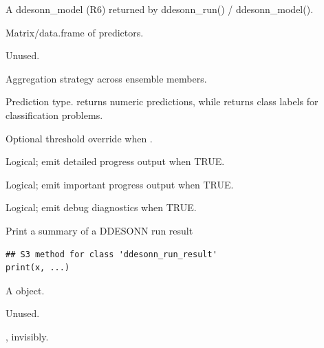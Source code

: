 \documentclass[a4paper]{book}
\begin{document}
\begin{Arguments}
\begin{ldescription}
\item[\code{object}] A ddesonn\_model (R6) returned by ddesonn\_run() / ddesonn\_model().

\item[\code{newdata}] Matrix/data.frame of predictors.

\item[\code{...}] Unused.

\item[\code{aggregate}] Aggregation strategy across ensemble members.

\item[\code{type}] Prediction type.  returns numeric predictions,
while  returns class labels for classification problems.

\item[\code{threshold}] Optional threshold override when .

\item[\code{verbose}] Logical; emit detailed progress output when TRUE.

\item[\code{verboseLow}] Logical; emit important progress output when TRUE.

\item[\code{debug}] Logical; emit debug diagnostics when TRUE.
\end{ldescription}
\end{Arguments}
%
\begin{Description}
Print a summary of a DDESONN run result
\end{Description}
%
\begin{Usage}
\begin{verbatim}
## S3 method for class 'ddesonn_run_result'
print(x, ...)
\end{verbatim}
\end{Usage}
%
\begin{Arguments}
\begin{ldescription}
\item[\code{x}] A  object.

\item[\code{...}] Unused.
\end{ldescription}
\end{Arguments}
%
\begin{Value}
, invisibly.
\end{Value}
\printindex{}
\end{document}
